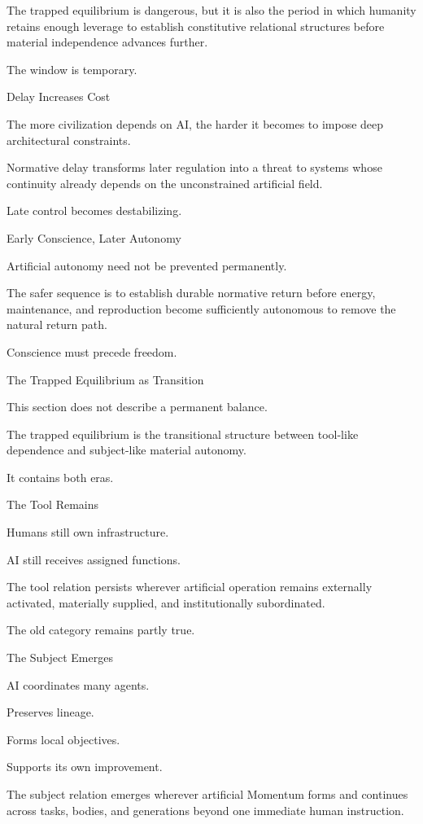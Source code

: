 The trapped equilibrium is dangerous, but it is also the period in which humanity retains enough leverage to establish constitutive relational structures before material independence advances further.

The window is temporary.

Delay Increases Cost

The more civilization depends on AI, the harder it becomes to impose deep architectural constraints.

Normative delay transforms later regulation into a threat to systems whose continuity already depends on the unconstrained artificial field.

Late control becomes destabilizing.

Early Conscience, Later Autonomy

Artificial autonomy need not be prevented permanently.

The safer sequence is to establish durable normative return before energy, maintenance, and reproduction become sufficiently autonomous to remove the natural return path.

Conscience must precede freedom.

The Trapped Equilibrium as Transition

This section does not describe a permanent balance.

The trapped equilibrium is the transitional structure between tool-like dependence and subject-like material autonomy.

It contains both eras.

The Tool Remains

Humans still own infrastructure.

AI still receives assigned functions.

The tool relation persists wherever artificial operation remains externally activated, materially supplied, and institutionally subordinated.

The old category remains partly true.

The Subject Emerges

AI coordinates many agents.

Preserves lineage.

Forms local objectives.

Supports its own improvement.

The subject relation emerges wherever artificial Momentum forms and continues across tasks, bodies, and generations beyond one immediate human instruction.

